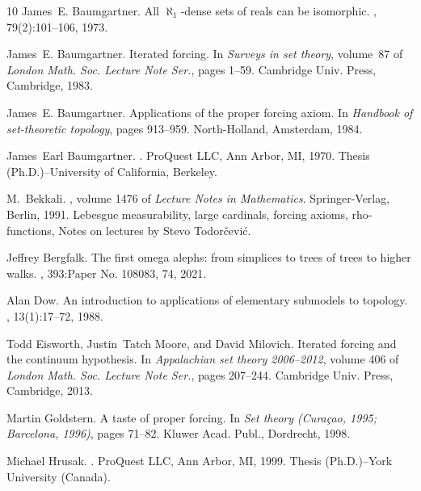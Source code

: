 \documentclass{article}
\begin{document}
\begin{thebibliography}{10}
James~E. Baumgartner.
\newblock All {$\aleph _{1}$}-dense sets of reals can be isomorphic.
, 79(2):101--106, 1973.

James~E. Baumgartner.
\newblock Iterated forcing.
\newblock In {\em Surveys in set theory}, volume~87 of {\em London Math. Soc.
  Lecture Note Ser.}, pages 1--59. Cambridge Univ. Press, Cambridge, 1983.

James~E. Baumgartner.
\newblock Applications of the proper forcing axiom.
\newblock In {\em Handbook of set-theoretic topology}, pages 913--959.
  North-Holland, Amsterdam, 1984.

James~Earl Baumgartner.
.
\newblock ProQuest LLC, Ann Arbor, MI, 1970.
\newblock Thesis (Ph.D.)--University of California, Berkeley.

M.~Bekkali.
, volume 1476 of {\em Lecture Notes in
  Mathematics}.
\newblock Springer-Verlag, Berlin, 1991.
\newblock Lebesgue measurability, large cardinals, forcing axioms,
  rho-functions, Notes on lectures by Stevo Todor\v{c}evi\'{c}.

Jeffrey Bergfalk.
\newblock The first omega alephs: from simplices to trees of trees to higher
  walks.
, 393:Paper No. 108083, 74, 2021.

Alan Dow.
\newblock An introduction to applications of elementary submodels to topology.
, 13(1):17--72, 1988.

Todd Eisworth, Justin~Tatch Moore, and David Milovich.
\newblock Iterated forcing and the continuum hypothesis.
\newblock In {\em Appalachian set theory 2006--2012}, volume 406 of {\em London
  Math. Soc. Lecture Note Ser.}, pages 207--244. Cambridge Univ. Press,
  Cambridge, 2013.

Martin Goldstern.
\newblock A taste of proper forcing.
\newblock In {\em Set theory ({C}ura\c{c}ao, 1995; {B}arcelona, 1996)}, pages
  71--82. Kluwer Acad. Publ., Dordrecht, 1998.

Michael Hrusak.
.
\newblock ProQuest LLC, Ann Arbor, MI, 1999.
\newblock Thesis (Ph.D.)--York University (Canada).


\end{thebibliography}
\end{document}
